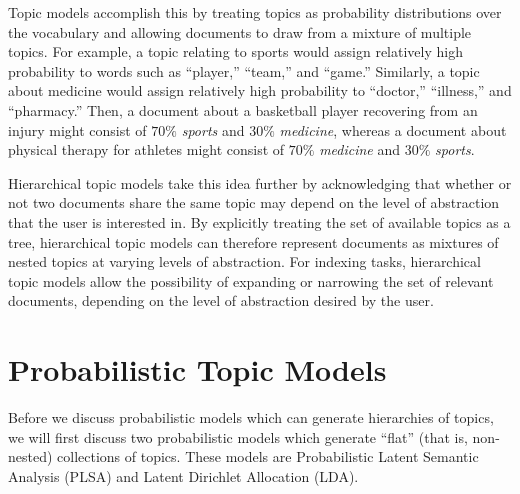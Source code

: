 \documentclass{article}
\begin{document}
Topic models accomplish this by treating topics as probability distributions over the vocabulary and allowing documents to draw from a mixture of multiple topics.
For example, a topic relating to sports would assign relatively high probability to words such as ``player,'' ``team,'' and ``game.''
Similarly, a topic about medicine would assign relatively high probability to ``doctor,'' ``illness,'' and ``pharmacy.''
Then, a document about a basketball player recovering from an injury might consist of $70\%$ \emph{sports} and $30\%$ \emph{medicine}, whereas a document about physical therapy for athletes might consist of $70\%$ \emph{medicine} and $30\%$ \emph{sports}.

Hierarchical topic models take this idea further by acknowledging that whether or not two documents share the same topic may depend on the level of abstraction that the user is interested in.
By explicitly treating the set of available topics as a tree, hierarchical topic models can therefore represent documents as mixtures of nested topics at varying levels of abstraction.
For indexing tasks, hierarchical topic models allow the possibility of expanding or narrowing the set of relevant documents, depending on the level of abstraction desired by the user.

\section{Probabilistic Topic Models}

Before we discuss probabilistic models which can generate hierarchies of topics, we will first discuss two probabilistic models which generate ``flat'' (that is, non-nested) collections of topics.
These models are Probabilistic Latent Semantic Analysis (PLSA) and Latent Dirichlet Allocation (LDA).
\end{document}
